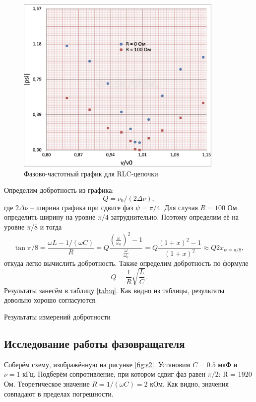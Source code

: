 \documentclass[12pt,a4paper]{article}
\begin{document}
    \begin{figure}[h!]
    	\centering
    	\includegraphics[width=10cm]{src/RLC.png}
    	\caption{Фазово-частотный график для RLC-цепочки}
    	\label{fig:pltrlc}
    \end{figure}
    
Определим добротность из графика: 
$$Q=\nu_0/(2\Delta \nu),$$
где $2\Delta \nu$ -- ширина графика при сдвиге фаз $\psi = \pi/4$. Для случая $R=100$ Ом определить ширину на уровне $\pi/4$ затруднительно. Поэтому определим её на уровне $\pi/8$ и тогда 
$$\tan \pi/8 = \frac{\omega L - 1/(\omega C)}{R} = Q \frac{\left(\frac{\omega}{\omega_0}\right)^2-1 }{\frac{\omega}{\omega_0}} =Q \frac{(1+x)^2-1}{(1+x)^2} \approx Q 2 x_{\psi = \pi/8},$$
откуда легко вычислить добротность.
Также определим добротность по формуле
$$Q=\frac{1}{R}\sqrt{\frac{L}{C}}.$$
Результаты занесём в таблицу \ref{tab:q}. Как видно из таблицы, результаты довольно хорошо согласуются.

\begin{table}[H]
	\caption{Результаты измерений добротности}
	
	\label{tab:q}
\end{table}

\subsection*{Исследование работы фазовращателя}

Соберём схему, изображённую на рисунке \ref{fig:s2}. Установим $C = 0.5$ мкФ и $\nu = 1$ кГц. Подберём сопротивление, при котором сдвиг фаз равен $\pi/2$: R = 1920 Ом. Теоретическое значение $R=1/(\omega C)=2$ кОм. Как видно, значения совпадают в пределах погрешности.
\end{document}
